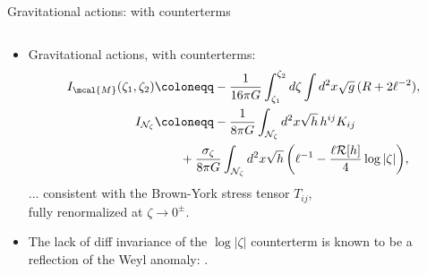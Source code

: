 \documentclass[
	10pt
	,noamsthm
]{beamer}
\begin{document}
\begin{frame}{Gravitational actions: with counterterms}{%
	\textcite{Donnelly:2018bef,Li:2020zjb}
}
\begin{columns}
\begin{column}{1.1\textwidth}
\vspace{-.3\baselineskip}
\begin{itemize}

\item Gravitational actions, with counterterms:
	\begin{align*}
		I_{\mcal{M}}(\zeta_1, \zeta_2) & \coloneqq - \frac{1}{16\pi G} \int_{\zeta_1}^{\zeta_2} d\zeta \int d^2 x \sqrt{g} \, (R + 2 \ell^{-2}),  %
	\\
		I_{\mathcal N_{\zeta}} & \coloneqq  - \frac{1}{8\pi G} \int_{\mathcal N_{\zeta}} d^2x \sqrt{h}\,h^{ij} K_{ij} 
	\\& \qquad + \frac{\sigma_\zeta}{8\pi G} \int_{\mathcal N_{\zeta}} d^2x \sqrt{h} \, \bigg(\ell^{-1} - \frac{\ell  \mathcal{R}[h]}{4} \log |\zeta| \bigg), %
	\end{align*}
	... consistent with the Brown-York stress tensor $T_{ij}$, \\
	fully renormalized at $\zeta \to 0^\pm$. 
	
	\item The lack of diff invariance of the $\log |\zeta|$ counterterm is known to be a reflection of the Weyl anomaly: \textsl{\citeauthor{Henningson:1998gx,deHaro:2000vlm,Papadimitriou:2010as}}.
	
\end{itemize}
\end{column}
\end{columns}
\end{frame}
\end{document}
